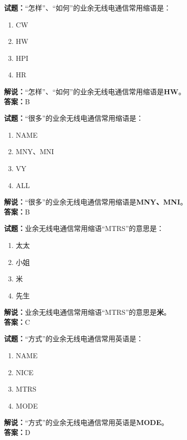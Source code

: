 \documentclass{ctexbook}
\begin{document}
\vspace{1em}

\textbf{试题：}“怎样”、“如何”的业余无线电通信常用缩语是：
\begin{enumerate}[leftmargin=3em]
  \item CW
  \item HW
  \item HPI
  \item HR
\end{enumerate}
\noindent\textbf{解说：}“怎样”、“如何”的业余无线电通信常用缩语是\textbf{HW}。\\\noindent\textbf{答案：}B

\vspace{1em}

\textbf{试题：}“很多”的业余无线电通信常用缩语是：
\begin{enumerate}[leftmargin=3em]
  \item NAME
  \item MNY、MNI
  \item VY
  \item ALL
\end{enumerate}
\noindent\textbf{解说：}“很多”的业余无线电通信常用缩语是\textbf{MNY、MNI}。\\\noindent\textbf{答案：}B

\vspace{1em}

\textbf{试题：}业余无线电通信常用缩语“MTRS”的意思是：
\begin{enumerate}[leftmargin=3em]
  \item 太太
  \item 小姐
  \item 米
  \item 先生
\end{enumerate}
\noindent\textbf{解说：}业余无线电通信常用缩语“MTRS”的意思是\textbf{米}。\\\noindent\textbf{答案：}C

\vspace{1em}

\textbf{试题：}“方式”的业余无线电通信常用英语是：
\begin{enumerate}[leftmargin=3em]
  \item NAME
  \item NICE
  \item MTRS
  \item MODE
\end{enumerate}
\noindent\textbf{解说：}“方式”的业余无线电通信常用英语是\textbf{MODE}。\\\noindent\textbf{答案：}D
\end{document}
